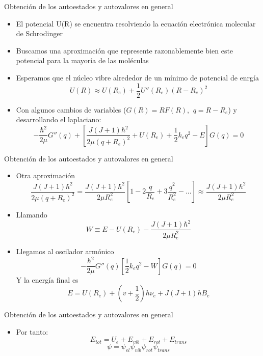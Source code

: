 \documentclass[a4paper]{beamer}
\begin{document}
\begin{frame}{Obtención de los autoestados y autovalores en general}
\begin{itemize}
\item El potencial U(R) se encuentra resolviendo la ecuación electrónica molecular de Schrodinger
\item Buscamos una aproximación que represente razonablemente bien este potencial para la mayoría de las moléculas
\item Esperamos que el núcleo vibre alrededor de un mínimo de potencial de enrgía
\begin{equation*}
U(R) \approx U(R_e)+\frac{1}{2}U''(R_e)(R-R_e)^2
\end{equation*}
\item Con algunos cambios de variables ($G(R)=RF(R), \,\ q=R-R_e$) y desarrollando el laplaciano:
\begin{equation*}
-\frac{\hbar^2}{2\mu}G''(q)+\left[\frac{J(J+1)\hbar^2}{2\mu (q+R_e)^2}+U(R_e)+\frac{1}{2}k_eq^2-E\right]G(q)=0
\end{equation*}
\end{itemize}
\end{frame}

\begin{frame}{Obtención de los autoestados y autovalores en general}
\begin{itemize}
\item Otra aproximación
\begin{equation*}
\frac{J(J+1)\hbar^2}{2\mu (q+R_e)^2}=\frac{J(J+1)\hbar^2}{2\mu R_e^2}\left[1-2\frac{q}{R_e}+3\frac{q^2}{R_e^2}-...\right] \approx \frac{J(J+1)\hbar^2}{2\mu R_e^2}
\end{equation*}
\item Llamando
\begin{equation*}
W \equiv	E-U(R_e)-\frac{J(J+1)\hbar^2}{2\mu R_e^2}
\end{equation*}
\item Llegamos al oscilador armónico
\begin{equation}
-\frac{\hbar^2}{2\mu}G''(q)\left[\frac{1}{2}k_eq^2-W\right] G(q)=0
\end{equation}
Y la energía final es
\begin{equation}
E=U(R_e)+\left(v+\frac{1}{2}\right)h\nu_e+J(J+1)hB_e
\end{equation}
\end{itemize}
\end{frame}

\begin{frame}{Obtención de los autoestados y autovalores en general}
\begin{itemize}
\item Por tanto:
\begin{equation}
E_{tot} = U_e+E_{vib}+E_{rot}+E_{trans}
\end{equation}
\begin{equation}
\psi=\psi_{el}\psi_{vib}\psi_{rot}\psi_{trans}
\end{equation}
\end{itemize}

\end{frame}
\end{document}
